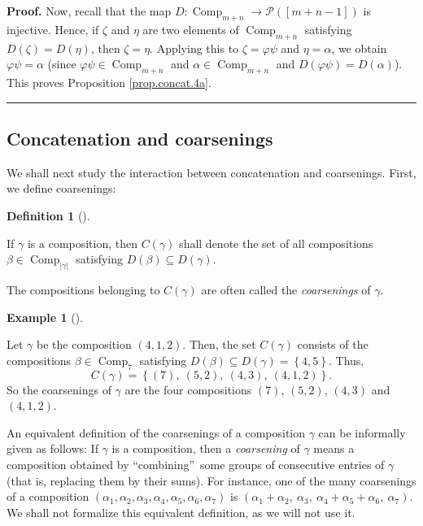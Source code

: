 \documentclass[numbers=enddot,12pt,final,onecolumn,notitlepage]{scrartcl}%
\theoremstyle{definition}
\newtheorem{defi}[theo]{Definition}
\newenvironment{definition}[1][]
{\begin{defi}[#1]\begin{leftbar}}
{\end{leftbar}\end{defi}}
\newtheorem{exam}[theo]{Example}
\newenvironment{example}[1][]
{\begin{exam}[#1]\begin{leftbar}}
{\end{leftbar}\end{exam}}
\newenvironment{proof}[1][Proof]{\noindent\textbf{#1.} }{\ \rule{0.5em}{0.5em}}
\begin{document}
\begin{proof}
Now, recall that the map $D:\operatorname*{Comp}\nolimits_{m+n}\rightarrow
\mathcal{P}\left(  \left[  m+n-1\right]  \right)  $ is injective. Hence, if
$\zeta$ and $\eta$ are two elements of $\operatorname*{Comp}\nolimits_{m+n}$
satisfying $D\left(  \zeta\right)  =D\left(  \eta\right)  $, then $\zeta=\eta
$. Applying this to $\zeta=\varphi\psi$ and $\eta=\alpha$, we obtain
$\varphi\psi=\alpha$ (since $\varphi\psi\in\operatorname*{Comp}\nolimits_{m+n}%
$ and $\alpha\in\operatorname*{Comp}\nolimits_{m+n}$ and $D\left(  \varphi
\psi\right)  =D\left(  \alpha\right)  $). This proves Proposition
\ref{prop.concat.4a}.
\end{proof}

\subsection{Concatenation and coarsenings}

We shall next study the interaction between concatenation and coarsenings.
First, we define coarsenings:

\begin{definition}
If $\gamma$ is a composition, then $C\left(  \gamma\right)  $ shall denote the
set of all compositions $\beta\in\operatorname*{Comp}\nolimits_{\left\vert
\gamma\right\vert }$ satisfying $D\left(  \beta\right)  \subseteq D\left(
\gamma\right)  $.

The compositions belonging to $C\left(  \gamma\right)  $ are often called the
\emph{coarsenings} of $\gamma$.
\end{definition}

\begin{example}
Let $\gamma$ be the composition $\left(  4,1,2\right)  $. Then, the set
$C\left(  \gamma\right)  $ consists of the compositions $\beta\in
\operatorname*{Comp}\nolimits_{7}$ satisfying $D\left(  \beta\right)
\subseteq D\left(  \gamma\right)  =\left\{  4,5\right\}  $. Thus,%
\[
C\left(  \gamma\right)  =\left\{  \left(  7\right)  ,\ \left(  5,2\right)
,\ \left(  4,3\right)  ,\ \left(  4,1,2\right)  \right\}  .
\]
So the coarsenings of $\gamma$ are the four compositions $\left(  7\right)  $,
$\left(  5,2\right)  $, $\left(  4,3\right)  $ and $\left(  4,1,2\right)  $.
\end{example}

An equivalent definition of the coarsenings of a composition $\gamma$ can be
informally given as follows: If $\gamma$ is a composition, then a
\emph{coarsening} of $\gamma$ means a composition obtained by
\textquotedblleft combining\textquotedblright\ some groups of consecutive
entries of $\gamma$ (that is, replacing them by their sums). For instance, one
of the many coarsenings of a composition $\left(  \alpha_{1},\alpha_{2}%
,\alpha_{3},\alpha_{4},\alpha_{5},\alpha_{6},\alpha_{7}\right)  $ is $\left(
\alpha_{1}+\alpha_{2},\ \alpha_{3},\ \alpha_{4}+\alpha_{5}+\alpha_{6}%
,\ \alpha_{7}\right)  $. We shall not formalize this equivalent definition, as
we will not use it.
\end{document}
